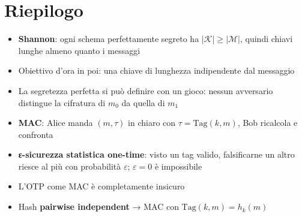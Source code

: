 \section{Riepilogo}

\begin{itemize}
\tightlist
\item
  \textbf{Shannon}: ogni schema perfettamente segreto ha \(|\mathcal{K}| \ge |\mathcal{M}|\), quindi chiavi lunghe almeno quanto i messaggi
\item
  Obiettivo d'ora in poi: una chiave di lunghezza indipendente dal messaggio
\item
  La segretezza perfetta si può definire con un gioco: nessun avversario distingue la cifratura di \(m_0\) da quella di \(m_1\)
\item
  \textbf{MAC}: Alice manda \((m, \tau)\) in chiaro con \(\tau = \text{Tag}(k, m)\), Bob ricalcola e confronta
\item
  \textbf{ε-sicurezza statistica one-time}: visto un tag valido, falsificarne un altro riesce al più con probabilità \(\varepsilon\); \(\varepsilon = 0\) è impossibile
\item
  L'OTP come MAC è completamente insicuro
\item
  Hash \textbf{pairwise independent} → MAC con \(\text{Tag}(k, m) = h_k(m)\)
\end{itemize}
